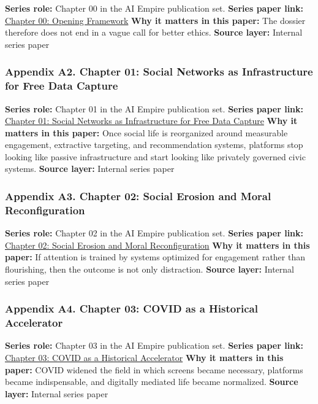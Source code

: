 \documentclass[
  american,
  11pt,
  letterpaper,
]{article}
\begin{document}
\textbf{Series role:} Chapter 00 in the AI Empire publication set.
\textbf{Series paper link:}
\href{00_opening-framework_paper.html}{Chapter 00: Opening Framework}
\textbf{Why it matters in this paper:} The dossier therefore does not
end in a vague call for better ethics. \textbf{Source layer:} Internal
series paper

\subsubsection{Appendix A2. Chapter 01: Social Networks as
Infrastructure for Free Data
Capture}\label{appendix-a2-chapter-01-social-networks-as-infrastructure-for-free-data-capture}

\textbf{Series role:} Chapter 01 in the AI Empire publication set.
\textbf{Series paper link:}
\href{01_social-networks-data-capture_paper.html}{Chapter 01: Social
Networks as Infrastructure for Free Data Capture} \textbf{Why it matters
in this paper:} Once social life is reorganized around measurable
engagement, extractive targeting, and recommendation systems, platforms
stop looking like passive infrastructure and start looking like
privately governed civic systems. \textbf{Source layer:} Internal series
paper

\subsubsection{Appendix A3. Chapter 02: Social Erosion and Moral
Reconfiguration}\label{appendix-a3-chapter-02-social-erosion-and-moral-reconfiguration}

\textbf{Series role:} Chapter 02 in the AI Empire publication set.
\textbf{Series paper link:}
\href{02_social-erosion-and-moral-reconfiguration_paper.html}{Chapter
02: Social Erosion and Moral Reconfiguration} \textbf{Why it matters in
this paper:} If attention is trained by systems optimized for engagement
rather than flourishing, then the outcome is not only distraction.
\textbf{Source layer:} Internal series paper

\subsubsection{Appendix A4. Chapter 03: COVID as a Historical
Accelerator}\label{appendix-a4-chapter-03-covid-as-a-historical-accelerator}

\textbf{Series role:} Chapter 03 in the AI Empire publication set.
\textbf{Series paper link:}
\href{03_covid-historical-accelerator_paper.html}{Chapter 03: COVID as a
Historical Accelerator} \textbf{Why it matters in this paper:} COVID
widened the field in which screens became necessary, platforms became
indispensable, and digitally mediated life became normalized.
\textbf{Source layer:} Internal series paper
\end{document}

